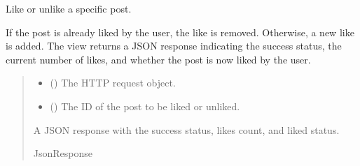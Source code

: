 \documentclass[letterpaper,10pt,english]{sphinxmanual}
\begin{document}
\begin{fulllineitems}
\label{\detokenize{modules/views:interactions.views.like_post}}
\pysigstartsignatures
{}
\pysigstopsignatures
\sphinxAtStartPar
Like or unlike a specific post.

\sphinxAtStartPar
If the post is already liked by the user, the like is removed.
Otherwise, a new like is added. The view returns a JSON response
indicating the success status, the current number of likes, and
whether the post is now liked by the user.
\begin{quote}\begin{description}
\begin{itemize}
\item {} 
\sphinxAtStartPar
{} () \textendash{} The HTTP request object.

\item {} 
\sphinxAtStartPar
{} () \textendash{} The ID of the post to be liked or unliked.

\end{itemize}

\sphinxAtStartPar
A JSON response with the success status, likes count, and liked status.

\sphinxAtStartPar
JsonResponse

\end{description}\end{quote}

\end{fulllineitems}

\end{document}
